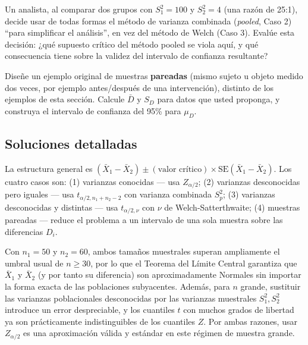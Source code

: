 \begin{problema}
	\label{prob:4b6b800}
	Un analista, al comparar dos grupos con $S_1^2=100$ y $S_2^2=4$ (una razón de 25:1), decide usar de todas formas el método de varianza combinada (\emph{pooled}, Caso 2) ``para simplificar el análisis'', en vez del método de Welch (Caso 3). Evalúe esta decisión: ¿qué supuesto crítico del método pooled se viola aquí, y qué consecuencia tiene sobre la validez del intervalo de confianza resultante?
\end{problema}

\begin{problema}
	\label{prob:ae13605}
	Diseñe un ejemplo original de muestras \textbf{pareadas} (mismo sujeto u objeto medido dos veces, por ejemplo antes/después de una intervención), distinto de los ejemplos de esta sección. Calcule $\bar D$ y $S_D$ para datos que usted proponga, y construya el intervalo de confianza del 95\% para $\mu_D$.
\end{problema}

\subsection*{Soluciones detalladas}

\begin{solproblema}
	La estructura general es $(\bar X_1-\bar X_2) \pm (\text{valor crítico})\times\text{SE}(\bar X_1-\bar X_2)$. Los cuatro casos son: (1) varianzas conocidas — usa $Z_{\alpha/2}$; (2) varianzas desconocidas pero iguales — usa $t_{\alpha/2,n_1+n_2-2}$ con varianza combinada $S_p^2$; (3) varianzas desconocidas y distintas — usa $t_{\alpha/2,\nu}$ con $\nu$ de Welch-Satterthwaite; (4) muestras pareadas — reduce el problema a un intervalo de una sola muestra sobre las diferencias $D_i$.
\end{solproblema}

\begin{solproblema}
	Con $n_1=50$ y $n_2=60$, ambos tamaños muestrales superan ampliamente el umbral usual de $n\ge30$, por lo que el Teorema del Límite Central garantiza que $\bar X_1$ y $\bar X_2$ (y por tanto su diferencia) son aproximadamente Normales sin importar la forma exacta de las poblaciones subyacentes. Además, para $n$ grande, sustituir las varianzas poblacionales desconocidas por las varianzas muestrales $S_1^2, S_2^2$ introduce un error despreciable, y los cuantiles $t$ con muchos grados de libertad ya son prácticamente indistinguibles de los cuantiles $Z$. Por ambas razones, usar $Z_{\alpha/2}$ es una aproximación válida y estándar en este régimen de muestra grande.
\end{solproblema}

